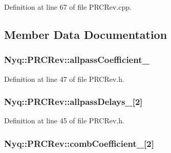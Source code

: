 Definition at line 67 of file P\+R\+C\+Rev.\+cpp.



\subsection{Member Data Documentation}
\subsubsection[{\texorpdfstring{allpass\+Coefficient\+\_\+}{allpassCoefficient_}}]{ Nyq\+::\+P\+R\+C\+Rev\+::allpass\+Coefficient\+\_\+\hspace{0.3cm}{\ttfamily [protected]}}\hypertarget{class_nyq_1_1_p_r_c_rev_a83cd09478ecc1a569b39596f57538084}{}\label{class_nyq_1_1_p_r_c_rev_a83cd09478ecc1a569b39596f57538084}


Definition at line 47 of file P\+R\+C\+Rev.\+h.

\subsubsection[{\texorpdfstring{allpass\+Delays\+\_\+}{allpassDelays_}}]{ Nyq\+::\+P\+R\+C\+Rev\+::allpass\+Delays\+\_\+\mbox{[}2\mbox{]}\hspace{0.3cm}{\ttfamily [protected]}}\hypertarget{class_nyq_1_1_p_r_c_rev_a1e366fb1db4cfc7c0157fddb42db57f3}{}\label{class_nyq_1_1_p_r_c_rev_a1e366fb1db4cfc7c0157fddb42db57f3}


Definition at line 45 of file P\+R\+C\+Rev.\+h.

\subsubsection[{\texorpdfstring{comb\+Coefficient\+\_\+}{combCoefficient_}}]{ Nyq\+::\+P\+R\+C\+Rev\+::comb\+Coefficient\+\_\+\mbox{[}2\mbox{]}\hspace{0.3cm}{\ttfamily [protected]}}\hypertarget{class_nyq_1_1_p_r_c_rev_a87d778e9df9fff26f4f93589ef5ab238}{}\label{class_nyq_1_1_p_r_c_rev_a87d778e9df9fff26f4f93589ef5ab238}


